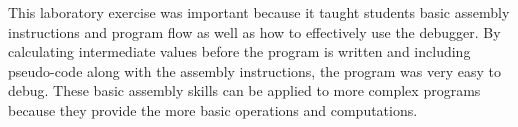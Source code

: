 \documentclass[\FontSize\FontUnit,letterpaper,oneside]{article}
\begin{document}
This laboratory exercise was important because it taught students basic assembly instructions
and program flow as well as how to effectively use the debugger. By calculating intermediate
values before the program is written and including pseudo-code along with the assembly instructions,
the program was very easy to debug. These basic assembly skills can be applied to more complex 
programs because they provide the more basic operations and computations.


\label{LastPage}
\end{document}
